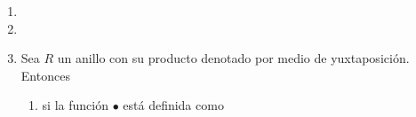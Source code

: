 \documentclass{article}
\newcommand{\lrprth}[1]{
    \left(#1\right)
}
\theoremstyle{definition}
\theoremstyle{plain}
\theoremstyle{plain}
\theoremstyle{definition}
\theoremstyle{definition}
\theoremstyle{definition}
\theoremstyle{definition}
\theoremstyle{definition}
\theoremstyle{definition}
\begin{document}
\begin{enumerate}[label=\textbf{Ej \arabic*.}]
\begin{proof}
    con $\lambda_\bullet$ definido como en (b).\\
    Por los (a) y (b) las aplicaciones $f$ y $g$ son funciones bien definidas.\\
    Sea $\lrprth{{}_RM,\bullet}\in {}_RMod$. Entonces
    \begin{align*}
        f\circ g\lrprth{\lrprth{{}_RM,\bullet}}&=f\lrprth{g\lrprth{\lrprth{{}_RM,\bullet}}}\\
        &=f\lrprth{\lrprth{\lambda_\bullet,M}}\\
        &=\lrprth{{}_RM,\bullet_{\lambda_\bullet}}.
        \intertext{Sean $r\in R$ y $m\in M$. Así}
        r\bullet_{\lambda_\bullet}m&=\lambda_\bullet(r)\lrprth{m}\\
        &=r\bullet m\\
        &\implies \bullet=\bullet_{\lambda_\bullet}.\\
        &\implies f\circ g\lrprth{\lrprth{{}_RM,\bullet}}=\lrprth{{}_RM,\bullet}\\
        \implies f\circ g&=Id_{{}_RMod}.
        \intertext{Ahora, sea $\lrprth{\lambda,M}\in {}_RRep$. Luego}
         g\circ f\lrprth{\lrprth{\lambda,M}}&=g\lrprth{f\lrprth{\lrprth{\lambda,M}}}\\
         &=g\lrprth{\lrprth{{}_RM,\bullet_\lambda}}\\
         &=\lrprth{\lambda_{\bullet_\lambda},M}.
         \intertext{Sea $r\in R$ y $m\in M$. Se tiene que}
         \lambda_{\bullet_\lambda}(r)\lrprth{m}&=r\bullet_\lambda m\\
         &=\lambda(r)\lrprth{m}\\
         &\implies \lambda_{\bullet_\lambda}(r)=\lambda(r)\\
         &\implies \lambda_{\bullet_\lambda}=\lambda\\
         &\implies g\circ f\lrprth{\lrprth{\lambda,M}}=\lrprth{\lambda, M}\\
         \implies g\circ f &=Id_{{}_RRep}.
    \end{align*}
    De modo que $f$ es invertible, con inversa $g$, y por lo tanto es una biyección, con lo cual se tiene lo deseado.
    \end{proof}
    \item 
    \item 
    \item Sea $R$ un anillo con su producto denotado por medio de yuxtaposición. Entonces
    \begin{enumerate}[label=(\alph*)]
        \item si la función $\bullet$ está definida como

\end{enumerate}
\end{enumerate}
\end{document}
